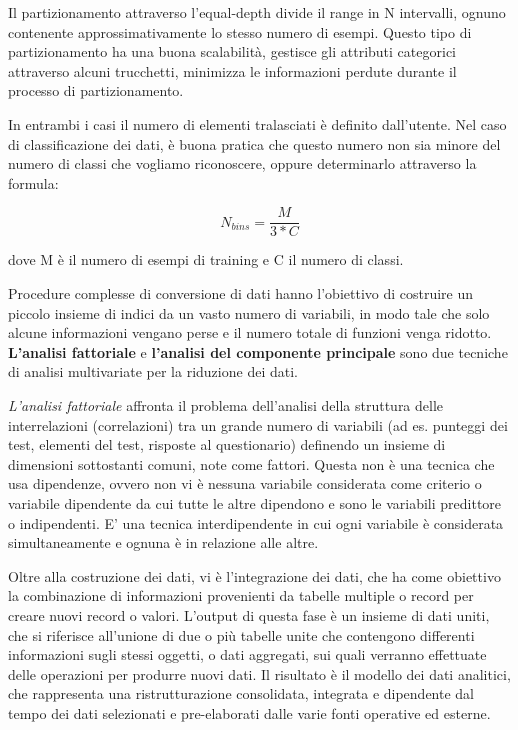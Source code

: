 \documentclass[a4paper]{extarticle}
\begin{document}
Il partizionamento attraverso l'equal-depth divide il range in N intervalli, ognuno contenente approssimativamente lo stesso numero di esempi. Questo tipo di partizionamento ha una buona scalabilità, gestisce gli attributi categorici attraverso alcuni trucchetti, minimizza le informazioni perdute durante il processo di partizionamento.

In entrambi i casi il numero di elementi tralasciati è definito dall'utente. Nel caso di classificazione dei dati, è buona pratica che questo numero non sia minore del numero di classi che vogliamo riconoscere, oppure determinarlo attraverso la formula:

\begin{equation}
N_{bins} = \dfrac{M}{3*C}
\end{equation}

dove M è il numero di esempi di training e C il numero di classi.

Procedure complesse di conversione di dati hanno l'obiettivo di costruire un piccolo insieme di indici da un vasto numero di variabili, in modo tale che solo alcune informazioni vengano perse e il numero totale di funzioni venga ridotto. \textbf{L'analisi fattoriale} e \textbf{l'analisi del componente principale} sono due tecniche di analisi multivariate per la riduzione dei dati. 

\textit{L'analisi fattoriale} affronta il problema dell'analisi della struttura delle interrelazioni (correlazioni) tra un grande numero di variabili (ad es. punteggi dei test, elementi del test, risposte al questionario) definendo un insieme di dimensioni sottostanti comuni, note come fattori. Questa non è una tecnica che usa dipendenze, ovvero non vi è nessuna variabile considerata come criterio o variabile dipendente da cui tutte le altre dipendono e sono le variabili predittore o indipendenti. E' una tecnica interdipendente in cui ogni variabile è considerata simultaneamente e ognuna è in relazione alle altre.

Oltre alla costruzione dei dati, vi è l'integrazione dei dati, che ha come obiettivo la combinazione di informazioni provenienti da tabelle multiple o record per creare nuovi record o valori. L'output di questa fase è un insieme di dati uniti, che si riferisce all'unione di due o più tabelle unite che contengono differenti informazioni sugli stessi oggetti, o dati aggregati, sui quali verranno effettuate delle operazioni per produrre nuovi dati. Il risultato è il modello dei dati analitici, che rappresenta una ristrutturazione consolidata, integrata e dipendente dal tempo dei dati selezionati e pre-elaborati dalle varie fonti operative ed esterne. 
\end{document}
